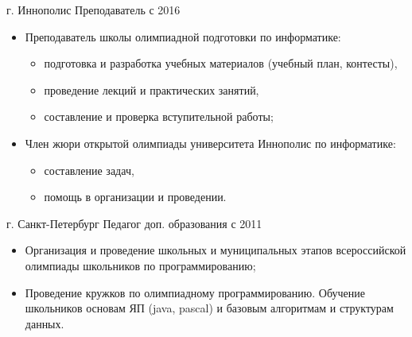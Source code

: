 \documentclass{cv}
\begin{document}
\begin{cvblock}{%
             {г. Иннополис}%
             {Преподаватель}%
             {с 2016}}
  \begin{itemize}
    \item Преподаватель школы олимпиадной подготовки по информатике:
          \begin{itemize}
              \item подготовка и разработка учебных материалов (учебный план,
                    контесты),
              \item проведение лекций и практических занятий,
              \item составление и проверка вступительной работы;
         \end{itemize}
    \item Член жюри открытой олимпиады университета Иннополис по информатике:
          \begin{itemize}
              \item составление задач,
              \item помощь в организации и проведении.
         \end{itemize}
  \end{itemize}
\end{cvblock}

\vspace{2em}

\begin{cvblock}{%
             {г. Санкт-Петербург}%
             {Педагог доп. образования}%
             {с 2011}}

  \begin{itemize}
    \item Организация и проведение школьных и муниципальных этапов 
          всероссийской олимпиады школьников по программированию;
    \item Проведение кружков по олимпиадному программированию. Обучение 
          школьников основам ЯП (java, pascal) и базовым алгоритмам и
          структурам данных.
  \end{itemize}
\end{cvblock}

\vspace{2em}
\end{document}
